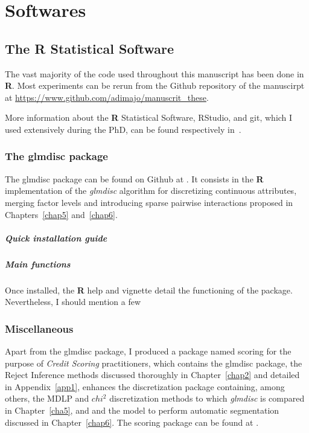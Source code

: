 \chapter{Softwares}

\section{The R Statistical Software}

The vast majority of the code used throughout this manuscript has been done in \textbf{R}. Most experiments can be rerun from the Github repository of the manuscirpt at \url{https://www.github.com/adimajo/manuscrit_these}.

More information about the \textbf{R} Statistical Software, RStudio, and git, which I used extensively during the PhD, can be found respectively in~\cite{}.

\subsection{The glmdisc package} \label{app2:glmdisc}

The glmdisc package can be found on Github at \url{}. It consists in the \textbf{R} implementation of the \textit{glmdisc} algorithm for discretizing continuous attributes, merging factor levels and introducing sparse pairwise interactions proposed in Chapters~\ref{chap5} and~\ref{chap6}.

\paragraph{Quick installation guide}

\paragraph{Main functions}

Once installed, the \textbf{R} help and vignette detail the functioning of the package. Nevertheless, I should mention a few 



\subsection{Miscellaneous}

Apart from the glmdisc package, I produced a package named scoring for the purpose of \textit{Credit Scoring} practitioners, which contains the glmdisc package, the Reject Inference methods discussed thoroughly in Chapter~\ref{chap2} and detailed in Appendix~\ref{app1}, enhances the discretization package containing, among others, the MDLP and $chi^2$ discretization methods to which \textit{glmdisc} is compared in Chapter~\ref{cha5}, and and the model to perform automatic segmentation discussed in Chapter~\ref{chap6}. The scoring package can be found at \url{}.

